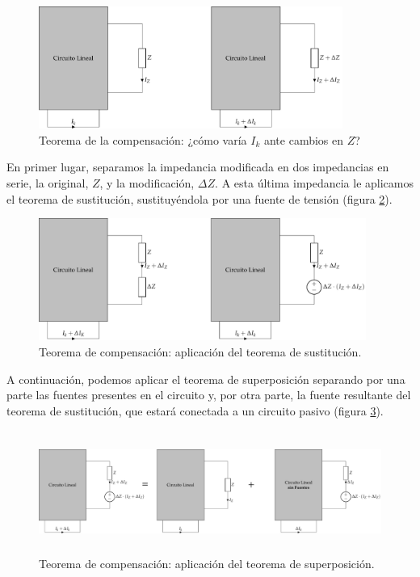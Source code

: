 \begin{figure}[H]
  \centering
  \includegraphics[height=4cm]{../figs/TeoremaCompensacion0.pdf}
  \caption{Teorema de la compensación: ¿cómo varía $I_k$ ante cambios en $Z$?}
  \label{fig:teorema-compensacion0}
\end{figure}


En primer lugar, separamos la impedancia modificada en dos impedancias en serie, la original, $Z$, y la modificación, $\Delta Z$. A esta última impedancia le aplicamos el teorema de sustitución, sustituyéndola por una fuente de tensión (figura \ref{fig:teorema-compensacion1}).

\begin{figure}[H]
  \centering
  \includegraphics[height=4cm]{../figs/TeoremaCompensacion1.pdf}
  \caption{Teorema de compensación: aplicación del teorema de sustitución.}
  \label{fig:teorema-compensacion1}
\end{figure}

A continuación, podemos aplicar el teorema de superposición separando por una parte las fuentes presentes en el circuito y, por otra parte, la fuente resultante del teorema de sustitución, que estará conectada a un circuito pasivo (figura \ref{fig:teorema-compensacion2}). 

\begin{figure}[H]
  \centering
  \includegraphics[height=4cm]{../figs/TeoremaCompensacion2.pdf}
  \caption{Teorema de compensación: aplicación del teorema de superposición.}
  \label{fig:teorema-compensacion2}
\end{figure}

